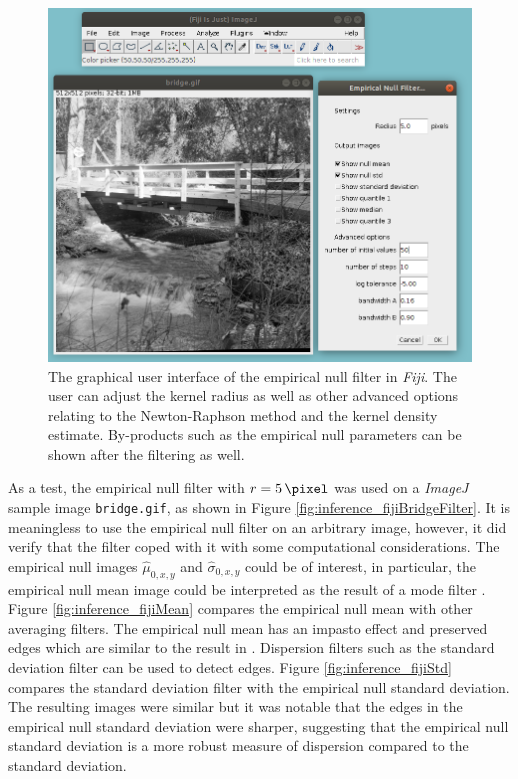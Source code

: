 \begin{figure}
    \centering
    \includegraphics[width=\textwidth]{../figures/inference/fiji/gui.png}
    \caption{The graphical user interface of the empirical null filter in \emph{Fiji}. The user can adjust the kernel radius as well as other advanced options relating to the Newton-Raphson method and the kernel density estimate. By-products such as the empirical null parameters can be shown after the filtering as well.}
    \label{fig:inference_fijiGui}
\end{figure}

As a test, the empirical null filter with $r=\SI{5}{\pixel}$ was used on a \emph{ImageJ} sample image \texttt{bridge.gif}, as shown in Figure \ref{fig:inference_fijiBridgeFilter}. It is meaningless to use the empirical null filter on an arbitrary image, however, it did verify that the filter coped with it with some computational considerations. The empirical null images $\widehat{\mu}_{0,x,y}$ and $\widehat{\sigma}_{0,x,y}$ could be of interest, in particular, the empirical null mean image could be interpreted as the result of a mode filter \citep{griffin2000mean}. Figure \ref{fig:inference_fijiMean} compares the empirical null mean with other averaging filters. The empirical null mean has an impasto effect and preserved edges which are similar to the result in \cite{griffin2000mean}. Dispersion filters such as the standard deviation filter can be used to detect edges. Figure \ref{fig:inference_fijiStd} compares the standard deviation filter with the empirical null standard deviation. The resulting images were similar but it was notable that the edges in the empirical null standard deviation were sharper, suggesting that the empirical null standard deviation is a more robust measure of dispersion compared to the standard deviation.

